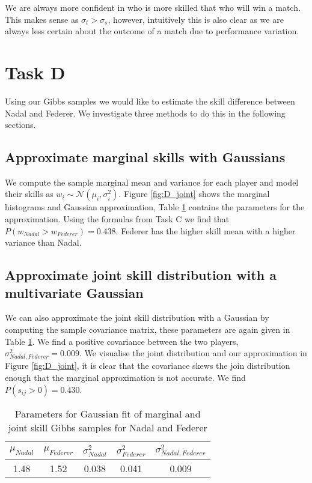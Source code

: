 \documentclass[11pt]{article}
\begin{document}
We are always more confident in who is more skilled that who will win a match. This makes sense as $\sigma_t > \sigma_s$, however, intuitively this is also clear as we are always less certain about the outcome of a match due to performance variation.

\section{Task D}
Using our Gibbs samples we would like to estimate the skill difference between Nadal and Federer. We investigate three methods to do this in the following sections.

\subsection{Approximate marginal skills with Gaussians}
We compute the sample marginal mean and variance for each player and model their skills as $w_i \sim \mathcal{N}(\mu_i, \sigma_i^2)$. Figure \ref{fig:D_joint} shows the marginal histograms and Gaussian approximation, Table \ref{tbl:D_gibbs_parameters} contains the parameters for the approximation. Using the formulas from Task C we find that $P(w_{Nadal} > w_{Federer}) = 0.438$. Federer has the higher skill mean with a higher variance than Nadal.

\subsection{Approximate joint skill distribution with a multivariate Gaussian}
We can also approximate the joint skill distribution with a Gaussian by computing the sample covariance matrix, these parameters are again given in Table \ref{tbl:D_gibbs_parameters}. We find a positive covariance between the two players, $\sigma_{Nadal, Federer}^2 = 0.009$. We visualise the joint distribution and our approximation in Figure \ref{fig:D_joint}, it is clear that the covariance skews the join distribution enough that the marginal approximation is not accurate. We find $P(s_{ij}>0) = 0.430$.

\begin{table}
    \centering
    \small
    \begin{tabular}{|c|c|c|c|c|}
        \hline
        $\mu_{Nadal}$ & $\mu_{Federer}$ & $\sigma_{Nadal}^2$ & $\sigma_{Federer}^2$ & $\sigma_{Nadal, Federer}^2$ \\
        \hline
        1.48 & 1.52 & 0.038 & 0.041 & 0.009 \\
        \hline
    \end{tabular}
    \caption{Parameters for Gaussian fit of marginal and joint skill Gibbs samples for Nadal and Federer}
    \label{tbl:D_gibbs_parameters}
\end{table}
\end{document}
